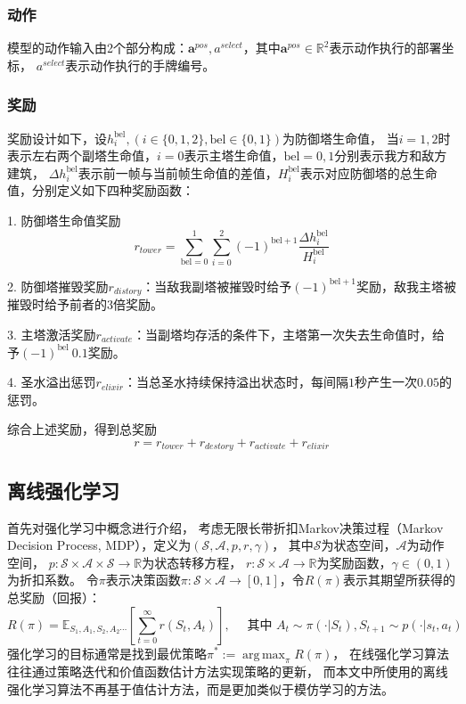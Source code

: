 \documentclass[openany,twoside,nofonts,AutoFakeBold,UTF8]{ctexbook}
\def\bd{\boldsymbol}        %
\DeclareMathOperator*{\argmax}{arg\,max}  %
\begin{document}
\subsubsection{动作}
模型的动作输入由2个部分构成：$\bd{a}^{pos}, a^{select}$，其中$\bd{a}^{pos}\in\mathbb{R}^2$表示动作执行的部署坐标，
$a^{select}$表示动作执行的手牌编号。

\subsubsection{奖励}\label{sec-reward}
奖励设计如下，设$h_{i}^{\text{bel}}, (i\in\{0,1,2\},\text{bel}\in\{0,1\})$为防御塔生命值，
当$i=1,2$时表示左右两个副塔生命值，$i=0$表示主塔生命值，$\text{bel}=0,1$分别表示我方和敌方建筑，
$\Delta h_{i}^{\text{bel}}$表示前一帧与当前帧生命值的差值，$H_{i}^{\text{bel}}$表示对应防御塔的总生命值，分别定义如下四种奖励函数：

1. 防御塔生命值奖励
\begin{equation}
  r_{tower} = \sum_{\text{bel}=0}^1\sum_{i=0}^2(-1)^{\text{bel}+1}\frac{\Delta h_{i}^{\text{bel}}}{H_{i}^{\text{bel}}}
\end{equation}

2. 防御塔摧毁奖励$r_{distory}$：当敌我副塔被摧毁时给予$(-1)^{\text{bel}+1}$奖励，敌我主塔被摧毁时给予前者的$3$倍奖励。

3. 主塔激活奖励$r_{activate}$：当副塔均存活的条件下，主塔第一次失去生命值时，给予$(-1)^{\text{bel}}~0.1$奖励。

4. 圣水溢出惩罚$r_{elixir}$：当总圣水持续保持溢出状态时，每间隔$1$秒产生一次$0.05$的惩罚。

综合上述奖励，得到总奖励
\begin{equation}\label{eq-reward}
  r = r_{tower} + r_{destory} + r_{activate} + r_{elixir}
\end{equation}
\subsection{离线强化学习}\label{sec-model-design}
首先对强化学习中概念进行介绍，
考虑无限长带折扣Markov决策过程（Markov Decision Process, MDP），定义为$(\mathcal{S},\mathcal{A},p,r,\gamma)$，
其中$\mathcal{S}$为状态空间，$\mathcal{A}$为动作空间，
$p:\mathcal{S}\times \mathcal{A}\times \mathcal{S}\to \mathbb{R}$为状态转移方程，
$r:\mathcal{S}\times\mathcal{A}\to \mathbb{R}$为奖励函数，$\gamma\in(0,1)$为折扣系数。
令$\pi$表示决策函数$\pi: \mathcal{S}\times \mathcal{A}\to [0,1]$，令$R(\pi)$表示其期望所获得的总奖励（回报）：
\begin{equation}
  R(\pi) = \mathbb{E}_{S_1,A_1,S_2,A_2\cdots}\left[\sum_{t=0}^{\infty}r(S_t,A_t)\right],\quad
  \text{~其中~}A_t\sim\pi(\cdot|S_t),S_{t+1}\sim p(\cdot|s_t,a_t)
\end{equation}
强化学习的目标通常是找到最优策略$\pi^* := \argmax_{\pi}R(\pi)$，
在线强化学习算法往往通过策略迭代和价值函数估计方法实现策略的更新，
而本文中所使用的离线强化学习算法不再基于值估计方法，而是更加类似于模仿学习的方法。
\end{document}
